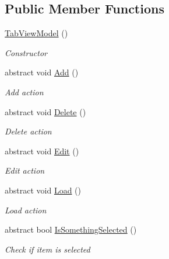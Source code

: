\subsection*{Public Member Functions}
\begin{DoxyCompactItemize}
\item 
\hyperlink{class_baudi_1_1_client_1_1_view_models_1_1_tabs_view_models_1_1_tab_view_model_a0c3f8372d817c448ef497e3cb8a95676}{Tab\+View\+Model} ()
\begin{DoxyCompactList}\small\item\em Constructor \end{DoxyCompactList}\item 
abstract void \hyperlink{class_baudi_1_1_client_1_1_view_models_1_1_tabs_view_models_1_1_tab_view_model_ac7640aa73d893de991cf6cea43b00891}{Add} ()
\begin{DoxyCompactList}\small\item\em Add action \end{DoxyCompactList}\item 
abstract void \hyperlink{class_baudi_1_1_client_1_1_view_models_1_1_tabs_view_models_1_1_tab_view_model_a7909430c71c3afee2625a1e170543dfc}{Delete} ()
\begin{DoxyCompactList}\small\item\em Delete action \end{DoxyCompactList}\item 
abstract void \hyperlink{class_baudi_1_1_client_1_1_view_models_1_1_tabs_view_models_1_1_tab_view_model_a066fda29a72283aeab91953abb33a5a4}{Edit} ()
\begin{DoxyCompactList}\small\item\em Edit action \end{DoxyCompactList}\item 
abstract void \hyperlink{class_baudi_1_1_client_1_1_view_models_1_1_tabs_view_models_1_1_tab_view_model_a0335c7ad4dd2e464703052988c5984e5}{Load} ()
\begin{DoxyCompactList}\small\item\em Load action \end{DoxyCompactList}\item 
abstract bool \hyperlink{class_baudi_1_1_client_1_1_view_models_1_1_tabs_view_models_1_1_tab_view_model_a1279cb57a224c1c1b1d79acd527c26c6}{Is\+Something\+Selected} ()
\begin{DoxyCompactList}\small\item\em Check if item is selected \end{DoxyCompactList}\item 

\end{DoxyCompactItemize}
